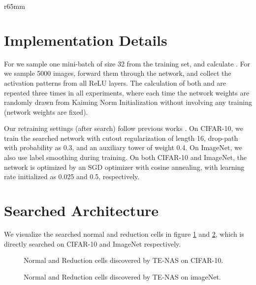 \documentclass{article} \usepackage{iclr2021_conference,times}
\begin{document}
\begin{wrapfigure}{r}{65mm}
\begin{center}




\newpage

\appendix

\section{Implementation Details}\label{sec:implementations}

For  we sample one mini-batch of size 32 from the training set, and calculate . For  we sample 5000 images, forward them through the network, and collect the activation patterns from all ReLU layers. The calculation of both  and  are repeated three times in all experiments, where each time the network weights are randomly drawn from Kaiming Norm Initialization \citep{he2015delving} without involving any training (network weights are fixed).

Our retraining settings (after search) follow previous works \citep{xu2019pc,chen2019progressive,chen2020stabilizing}. On CIFAR-10, we train the searched network with cutout regularization of length 16, drop-path \citep{zoph2018learning} with probability as 0.3, and an auxiliary tower of weight 0.4.
On ImageNet, we also use label smoothing during training.
On both CIFAR-10 and ImageNet, the network is optimized by an SGD optimizer with cosine annealing, with learning rate initialized as 0.025 and 0.5, respectively.

\section{Searched Architecture}

\label{app:vis}
We visualize the searched normal and reduction cells in figure \ref{fig:TE_cifar10} and \ref{fig:TE_imagenet}, which is directly searched on CIFAR-10 and ImageNet respectively.

\begin{figure}[!htb]
\centering
{}
\hfill
{}
\caption{Normal and Reduction cells discovered by TE-NAS on CIFAR-10.}
\label{fig:TE_cifar10}
\end{figure}

\begin{figure}[!htb]
\centering
{}
\hfill
{}
\caption{Normal and Reduction cells discovered by TE-NAS on imageNet.}
\label{fig:TE_imagenet}
\end{figure}



\end{center}
\end{wrapfigure}
\end{document}
